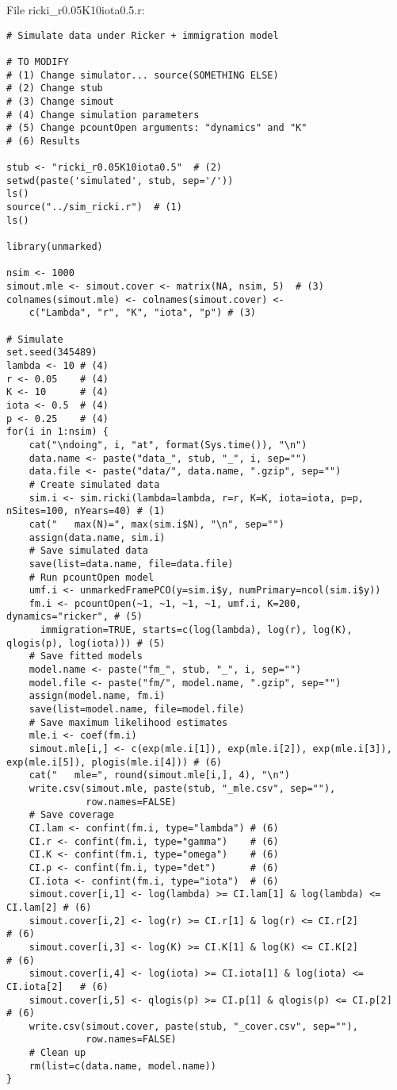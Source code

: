 \documentclass[12pt]{article}
\begin{document}
File ricki\_r0.05K10iota0.5.r:
\begin{verbatim}
# Simulate data under Ricker + immigration model

# TO MODIFY
# (1) Change simulator... source(SOMETHING ELSE)
# (2) Change stub
# (3) Change simout
# (4) Change simulation parameters
# (5) Change pcountOpen arguments: "dynamics" and "K"
# (6) Results

stub <- "ricki_r0.05K10iota0.5"  # (2)
setwd(paste('simulated', stub, sep='/'))
ls()
source("../sim_ricki.r")  # (1)
ls()

library(unmarked)

nsim <- 1000
simout.mle <- simout.cover <- matrix(NA, nsim, 5)  # (3)
colnames(simout.mle) <- colnames(simout.cover) <-
    c("Lambda", "r", "K", "iota", "p") # (3)

# Simulate
set.seed(345489)
lambda <- 10 # (4)
r <- 0.05    # (4)
K <- 10      # (4)
iota <- 0.5  # (4)
p <- 0.25    # (4)
for(i in 1:nsim) {
    cat("\ndoing", i, "at", format(Sys.time()), "\n")
    data.name <- paste("data_", stub, "_", i, sep="")
    data.file <- paste("data/", data.name, ".gzip", sep="")
    # Create simulated data
    sim.i <- sim.ricki(lambda=lambda, r=r, K=K, iota=iota, p=p, nSites=100, nYears=40) # (1)
    cat("   max(N)=", max(sim.i$N), "\n", sep="")
    assign(data.name, sim.i)
    # Save simulated data
    save(list=data.name, file=data.file)
    # Run pcountOpen model 
    umf.i <- unmarkedFramePCO(y=sim.i$y, numPrimary=ncol(sim.i$y))
    fm.i <- pcountOpen(~1, ~1, ~1, ~1, umf.i, K=200, dynamics="ricker", # (5)
      immigration=TRUE, starts=c(log(lambda), log(r), log(K), qlogis(p), log(iota))) # (5)
    # Save fitted models
    model.name <- paste("fm_", stub, "_", i, sep="")
    model.file <- paste("fm/", model.name, ".gzip", sep="")
    assign(model.name, fm.i)
    save(list=model.name, file=model.file) 
    # Save maximum likelihood estimates
    mle.i <- coef(fm.i)
    simout.mle[i,] <- c(exp(mle.i[1]), exp(mle.i[2]), exp(mle.i[3]), exp(mle.i[5]), plogis(mle.i[4])) # (6)
    cat("   mle=", round(simout.mle[i,], 4), "\n")
    write.csv(simout.mle, paste(stub, "_mle.csv", sep=""),
              row.names=FALSE)
    # Save coverage
    CI.lam <- confint(fm.i, type="lambda") # (6)
    CI.r <- confint(fm.i, type="gamma")    # (6)
    CI.K <- confint(fm.i, type="omega")    # (6)
    CI.p <- confint(fm.i, type="det")      # (6)
    CI.iota <- confint(fm.i, type="iota")  # (6)
    simout.cover[i,1] <- log(lambda) >= CI.lam[1] & log(lambda) <= CI.lam[2] # (6)
    simout.cover[i,2] <- log(r) >= CI.r[1] & log(r) <= CI.r[2]               # (6)
    simout.cover[i,3] <- log(K) >= CI.K[1] & log(K) <= CI.K[2]               # (6)
    simout.cover[i,4] <- log(iota) >= CI.iota[1] & log(iota) <= CI.iota[2]   # (6)
    simout.cover[i,5] <- qlogis(p) >= CI.p[1] & qlogis(p) <= CI.p[2]         # (6)
    write.csv(simout.cover, paste(stub, "_cover.csv", sep=""),
              row.names=FALSE)
    # Clean up
    rm(list=c(data.name, model.name))
}
\end{verbatim}
\end{document}

